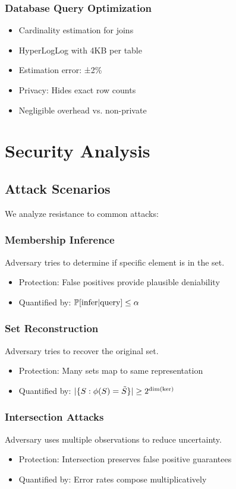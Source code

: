\documentclass[11pt]{article}
\begin{document}
\subsubsection{Database Query Optimization}
\begin{itemize}
\item Cardinality estimation for joins
\item HyperLogLog with 4KB per table
\item Estimation error: ±2\%
\item Privacy: Hides exact row counts
\item Negligible overhead vs. non-private
\end{itemize}

\section{Security Analysis}

\subsection{Attack Scenarios}

We analyze resistance to common attacks:

\subsubsection{Membership Inference}
Adversary tries to determine if specific element is in the set.
\begin{itemize}
\item Protection: False positives provide plausible deniability
\item Quantified by: $\mathbb{P}[\text{infer} | \text{query}] \leq \alpha$
\end{itemize}

\subsubsection{Set Reconstruction}
Adversary tries to recover the original set.
\begin{itemize}
\item Protection: Many sets map to same representation
\item Quantified by: $|\{S : \phi(S) = \tilde{S}\}| \geq 2^{\dim(\text{ker})}$
\end{itemize}

\subsubsection{Intersection Attacks}
Adversary uses multiple observations to reduce uncertainty.
\begin{itemize}
\item Protection: Intersection preserves false positive guarantees
\item Quantified by: Error rates compose multiplicatively
\end{itemize}
\end{document}
